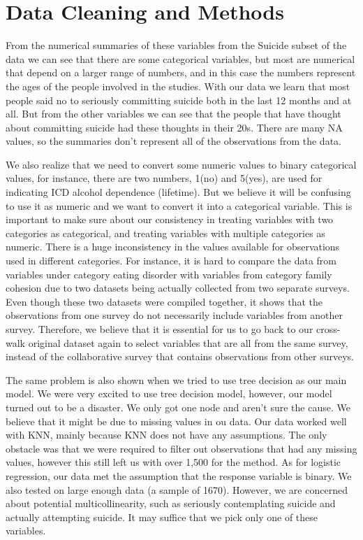 \documentclass[]{article}
\begin{document}
\section{Data Cleaning and Methods}\label{data-cleaning-and-methods}

From the numerical summaries of these variables from the Suicide subset
of the data we can see that there are some categorical variables, but
most are numerical that depend on a larger range of numbers, and in this
case the numbers represent the ages of the people involved in the
studies. With our data we learn that most people said no to seriously
committing suicide both in the last 12 months and at all. But from the
other variables we can see that the people that have thought about
committing suicide had these thoughts in their 20s. There are many NA
values, so the summaries don't represent all of the observations from
the data.

We also realize that we need to convert some numeric values to binary
categorical values, for instance, there are two numbers, 1(no) and
5(yes), are used for indicating ICD alcohol dependence (lifetime). But
we believe it will be confusing to use it as numeric and we want to
convert it into a categorical variable. This is important to make sure
about our consistency in treating variables with two categories as
categorical, and treating variables with multiple categories as numeric.
There is a huge inconsistency in the values available for observations
used in different categories. For instance, it is hard to compare the
data from variables under category eating disorder with variables from
category family cohesion due to two datasets being actually collected
from two separate surveys. Even though these two datasets were compiled
together, it shows that the observations from one survey do not
necessarily include variables from another survey. Therefore, we believe
that it is essential for us to go back to our cross-walk original
dataset again to select variables that are all from the same survey,
instead of the collaborative survey that contains observations from
other surveys.

The same problem is also shown when we tried to use tree decision as our
main model. We were very excited to use tree decision model, however,
our model turned out to be a disaster. We only got one node and aren't
sure the cause. We believe that it might be due to missing values in ou
data. Our data worked well with KNN, mainly because KNN does not have
any assumptions. The only obstacle was that we were required to filter
out observations that had any missing values, however this still left us
with over 1,500 for the method. As for logistic regression, our data met
the assumption that the response variable is binary. We also tested on
large enough data (a sample of 1670). However, we are concerned about
potential multicollinearity, such as seriously contemplating suicide and
actually attempting suicide. It may suffice that we pick only one of
these variables.
\end{document}
